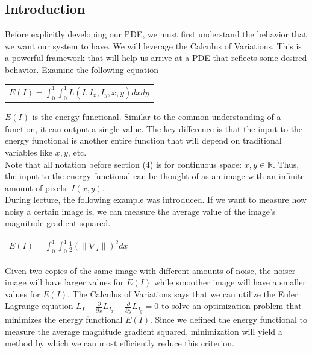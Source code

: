 \documentclass{article}
\begin{document}
  \subsection{Introduction}
  Before explicitly developing our PDE, we must first understand the behavior that we want our system to have.
  We will leverage the Calculus of Variations. This is a powerful framework that will help us arrive at a PDE
  that reflects some desired behavior. Examine the following equation
  \begin{center}
    \begin{tabular}{l}
      $E(I) = \int_{0}^{1} \int_{0}^{1} L(I, I_{x}, I_{y}, x, y) dx dy$
    \end{tabular}
  \end{center}

  \noindent
  $E(I)$ is the energy functional. Similar to the common understanding of a function, it can output
  a single value. The key difference is that the input to the energy functional is another entire
  function that will depend on traditional variables like $x,y$, etc.\\

  \noindent
  Note that all notation before section (4) is for continuous space: $x,y \in \mathbb{R}$. Thus,
  the input to the energy functional can be thought of as an image with an infinite amount of pixels: $I(x,y)$.\\

  \noindent
  During lecture, the following example was introduced. If we want to measure how noisy a certain image is,
  we can measure the average value of the image's magnitude gradient squared.
  \begin{center}
    \begin{tabular}{l}
      $E(I) = \int_{0}^{1} \int_{0}^{1} \frac{1}{2} (\| \nabla_{I} \|)^{2} dx$
    \end{tabular}
  \end{center}

  \noindent
  Given two copies of the same image with different amounts of noise, the noiser image will have larger values
  for $E(I)$ while smoother image will have a smaller values for $E(I)$. The Calculus of Variations says
  that we can utilize the Euler Lagrange equation
  $L_{I} - \frac{\partial}{\partial x}L_{I_{x}} - \frac{\partial}{\partial y}L_{I_{y}} = 0$ to solve an
  optimization problem that minimizes the energy functional $E(I)$. Since we defined the
  energy functional to measure the average magnitude gradient squared, minimization will yield a method
  by which we can most efficiently reduce this criterion.\\
\end{document}
